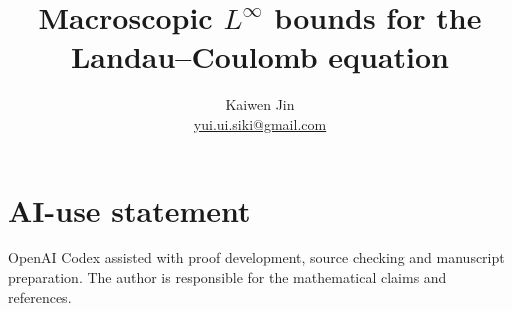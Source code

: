 \documentclass[11pt]{article}
\title{Macroscopic $L^\infty$ bounds for the Landau--Coulomb equation}
\author{Kaiwen Jin\\\small\href{mailto:yui.ui.siki@gmail.com}{yui.ui.siki@gmail.com}}
\date{}
\numberwithin{equation}{section}
\theoremstyle{remark}
\begin{document}
\maketitle





\section*{AI-use statement}
OpenAI Codex assisted with proof development, source checking and manuscript preparation. The author is responsible for the mathematical claims and references.


\end{document}
